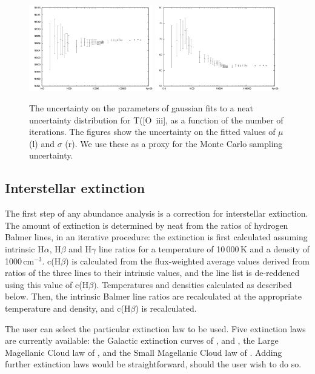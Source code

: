 \documentclass[useAMS,usenatbib]{mn2e}
\begin{document}
\begin{figure}
\includegraphics[width=0.48\textwidth]{figures/mulogx.png}
\includegraphics[width=0.48\textwidth]{figures/sigmalogx.png}
\caption{The uncertainty on the parameters of gaussian fits to a {\sc neat} uncertainty distribution for T([O~{\sc iii}], as a function of the number of iterations.  The figures show the uncertainty on the fitted values of $\mu$ (l) and $\sigma$ (r).  We use these as a proxy for the Monte Carlo sampling uncertainty.}
\label{samplefigure1}
\end{figure}

\subsection{Interstellar extinction}
\label{extinctionsection}
The first step of any abundance analysis is a correction for interstellar extinction.  The amount of extinction is determined by {\sc neat} from the ratios of hydrogen Balmer lines, in an iterative procedure: the extinction is first calculated assuming intrinsic H$\alpha$, H$\beta$ and H$\gamma$ line ratios for a temperature of 10\,000\,K and a density of 1000\,cm$^{-3}$.  c(H$\beta$) is calculated from the flux-weighted average values derived from ratios of the three lines to their intrinsic values, and the line list is de-reddened using this value of c(H$\beta)$.  Temperatures and densities calculated as described below.  Then, the intrinsic Balmer line ratios are recalculated at the appropriate temperature and density, and c(H$\beta$) is recalculated.

The user can select the particular extinction law to be used.  Five extinction laws are currently available: the Galactic extinction curves of \citet{1983MNRAS.203..301H}, \citet{1990ApJS...72..163F} and \citet{1989ApJ...345..245C}, the Large Magellanic Cloud law of \citet{1983MNRAS.203..301H}, and the Small Magellanic Cloud law of \citet{1984A&A...132..389P}.  Adding further extinction laws would be straightforward, should the user wish to do so.
\end{document}
